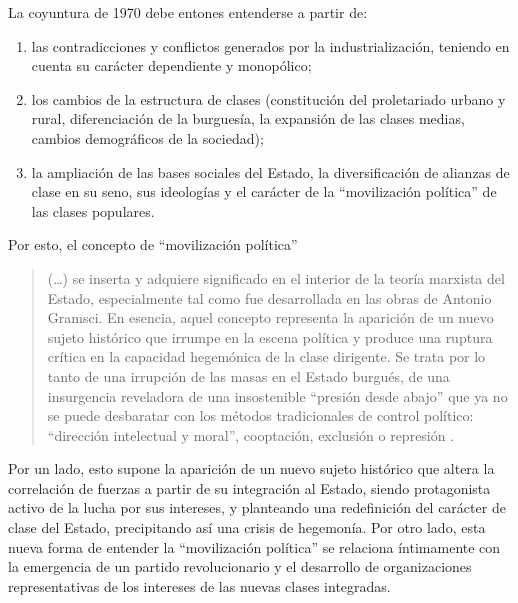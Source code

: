 La coyuntura de 1970 debe entones entenderse a partir de:

\begin{enumerate}
\item las contradicciones y conflictos generados por la industrialización, teniendo en cuenta su carácter dependiente y monopólico;
\item los cambios de la estructura de clases (constitución del proletariado urbano y rural, diferenciación de la burguesía, la expansión de las clases medias, cambios demográficos de la sociedad);
\item la ampliación de las bases sociales del Estado, la diversificación de alianzas de clase en su seno, sus ideologías y el carácter de la \enquote{movilización política} de las clases populares.
\end{enumerate}

Por esto, el concepto de \enquote{movilización política}

\begin{quote}
(\dots) se inserta y adquiere significado en el interior de la teoría marxista del Estado, especialmente tal como fue desarrollada en las obras de Antonio Gramsci. En esencia, aquel concepto representa la aparición de un nuevo sujeto histórico que irrumpe en la escena política y produce una ruptura crítica en la capacidad hegemónica de la clase dirigente. Se trata por lo tanto de una irrupción de las masas en el Estado burgués, de una insurgencia reveladora de una insostenible \enquote{presión desde abajo} que ya no se puede desbaratar con los métodos tradicionales de control político: \enquote{dirección intelectual y moral}, cooptación, exclusión o represión \parencite[71-72]{1574-BORON1975}.
\end{quote}

Por un lado, esto supone la aparición de un nuevo sujeto histórico que altera la correlación de fuerzas a partir de su integración al Estado, siendo protagonista activo de la lucha por sus intereses, y planteando una redefinición del carácter de clase del Estado, precipitando así una crisis de hegemonía. Por otro lado, esta nueva forma de entender la \enquote{movilización política} se relaciona íntimamente con la emergencia de un partido revolucionario y el desarrollo de organizaciones representativas de los intereses de las nuevas clases integradas.

